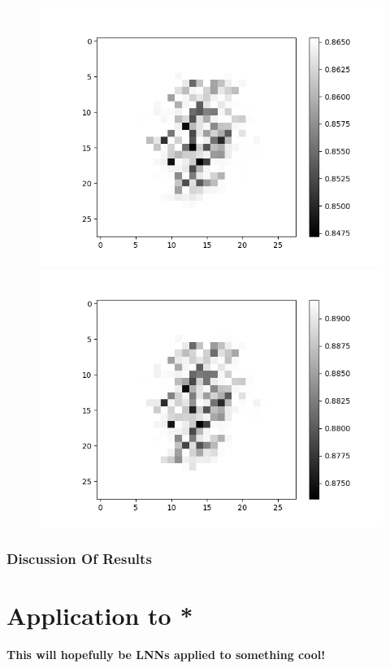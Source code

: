 \begin{figure}[H]
\begin{minipage}[b]{0.45\textwidth}
		\includegraphics[width=\textwidth]{LNN-AND-AND/Digit-5.png}
		\caption{}
		\label{fig:lnn-and-and-digit-5}
	\end{minipage}
	\begin{minipage}[b]{0.45\textwidth}
		\includegraphics[width=\textwidth]{LNN-AND-AND/Digit-8.png}
		\caption{}
		\label{fig:lnn-and-and-digit-8}
	\end{minipage}
	\hfill
\end{figure}

\subsection{Discussion Of Results}

\chapter{Application to *}
\textbf{This will hopefully be LNNs applied to something cool!}